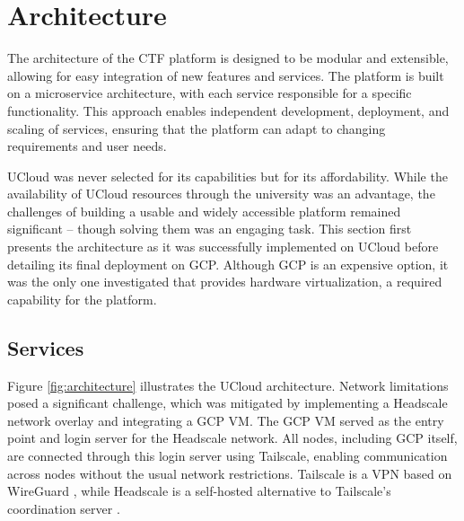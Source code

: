 \section{Architecture}\label{sec:architecture}
The architecture of the CTF platform is designed to be modular and extensible, allowing for easy integration of new features and services. The platform is built on a microservice architecture, with each service responsible for a specific functionality. This approach enables independent development, deployment, and scaling of services, ensuring that the platform can adapt to changing requirements and user needs.

UCloud was never selected for its capabilities but for its affordability. While the availability of UCloud resources through the university was an advantage, the challenges of building a usable and widely accessible platform remained significant -- though solving them was an engaging task. This section first presents the architecture as it was successfully implemented on UCloud before detailing its final deployment on GCP. Although GCP is an expensive option, it was the only one investigated that provides hardware virtualization, a required capability for the platform.

\subsection{Services}

Figure \ref{fig:architecture} illustrates the UCloud architecture. Network limitations posed a significant challenge, which was mitigated by implementing a Headscale network overlay and integrating a GCP VM. The GCP VM served as the entry point and login server for the Headscale network. All nodes, including GCP itself, are connected through this login server using Tailscale, enabling communication across nodes without the usual network restrictions. Tailscale is a VPN based on WireGuard \Parencite{TailscaleDocs}, while Headscale is a self-hosted alternative to Tailscale's coordination server \Parencite{TailscaleOpenSource}. 

